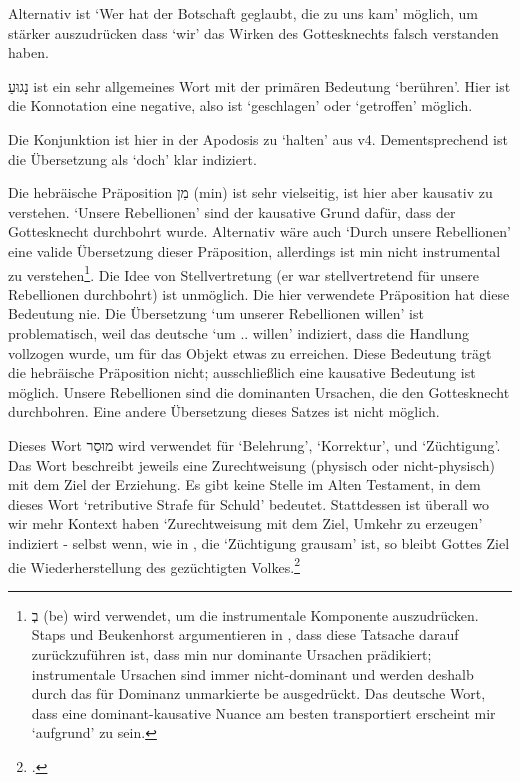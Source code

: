 \begin{description}
		Alternativ ist `Wer hat der Botschaft geglaubt, die zu uns kam' möglich, um stärker auszudrücken dass `wir' das Wirken des Gottesknechts falsch verstanden haben.
	\item[4 getroffen] נָגוּעַ ist ein sehr allgemeines Wort mit der primären Bedeutung `berühren'.
		Hier ist die Konnotation eine negative, also ist `geschlagen' oder `getroffen' möglich.
	\item[5 doch] Die Konjunktion ist hier in der Apodosis zu `halten' aus v4.
		Dementsprechend ist die Übersetzung als `doch' klar indiziert.
	\item[aufgrund unserer Rebellionen, aufgrund unserer Vergehen] Die hebräische Präposition מִן (min) ist sehr vielseitig, ist hier aber kausativ zu verstehen.
		`Unsere Rebellionen' sind der kausative Grund dafür, dass der Gottesknecht durchbohrt wurde.
		Alternativ wäre auch `Durch unsere Rebellionen' eine valide Übersetzung dieser Präposition, allerdings ist min nicht instrumental zu verstehen\footnote{
			בְ (be) wird verwendet, um die instrumentale Komponente auszudrücken.
			Staps und Beukenhorst argumentieren in \Cite{semantic-properties-of-prepositions}, dass diese Tatsache darauf zurückzuführen ist,
			dass min nur dominante Ursachen prädikiert; instrumentale Ursachen sind immer nicht-dominant und werden deshalb durch das für Dominanz unmarkierte be ausgedrückt.
			Das deutsche Wort, dass eine dominant-kausative Nuance am besten transportiert erscheint mir `aufgrund' zu sein.
		}.
		Die Idee von Stellvertretung (er war stellvertretend für unsere Rebellionen durchbohrt) ist unmöglich.
		Die hier verwendete Präposition hat diese Bedeutung nie.
		Die Übersetzung `um unserer Rebellionen willen' ist problematisch, weil das deutsche `um .. willen' indiziert, dass die Handlung vollzogen wurde,
		um für das Objekt etwas zu erreichen.
		Diese Bedeutung trägt die hebräische Präposition nicht; ausschließlich eine kausative Bedeutung ist möglich.
		Unsere Rebellionen sind die dominanten Ursachen, die den Gottesknecht durchbohren. Eine andere Übersetzung dieses Satzes ist nicht möglich.
	\item[Züchtigung] Dieses Wort מוּסַר wird verwendet für `Belehrung', `Korrektur', und `Züchtigung'.
		Das Wort beschreibt jeweils eine Zurechtweisung (physisch oder nicht-physisch) mit dem Ziel der Erziehung.
		Es gibt keine Stelle im Alten Testament, in dem dieses Wort `retributive Strafe für Schuld' bedeutet.
		Stattdessen ist überall wo wir mehr Kontext haben `Zurechtweisung mit dem Ziel, Umkehr zu erzeugen' indiziert -
		selbst wenn, wie in , die `Züchtigung grausam' ist, so bleibt Gottes Ziel die Wiederherstellung des gezüchtigten Volkes.\footnote{.
}
\end{description}
